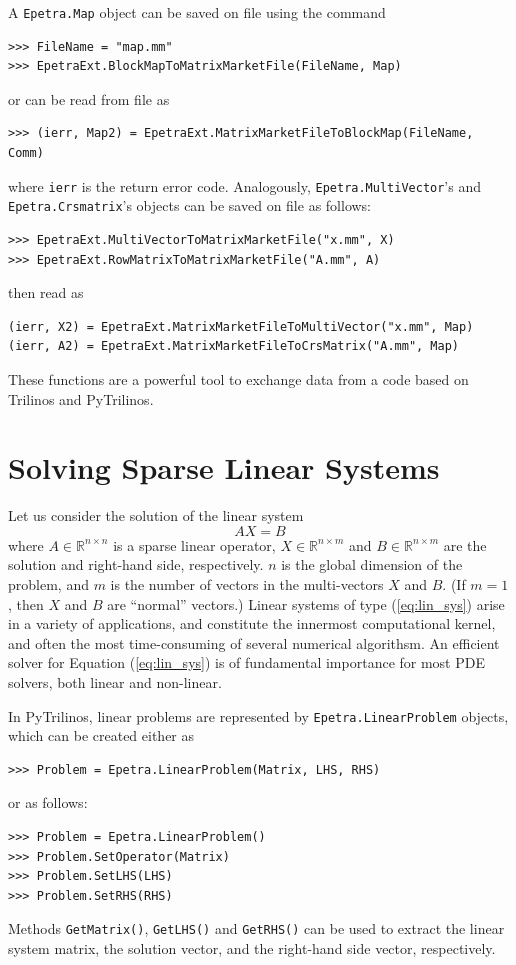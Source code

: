 \documentclass[10pt,relax]{SANDreport}
\newcommand{\PyTrilinos}{{PyTrilinos}}
\begin{document}
A {\tt Epetra.Map} object can be saved on file using the command
\begin{verbatim}
>>> FileName = "map.mm"
>>> EpetraExt.BlockMapToMatrixMarketFile(FileName, Map)
\end{verbatim}
or can be read from file as
\begin{verbatim}
>>> (ierr, Map2) = EpetraExt.MatrixMarketFileToBlockMap(FileName, Comm)
\end{verbatim}
where \verb!ierr! is the return error code. Analogously, 
\verb!Epetra.MultiVector!'s and \verb!Epetra.Crsmatrix!'s objects
can be saved on file as follows:
\begin{verbatim}
>>> EpetraExt.MultiVectorToMatrixMarketFile("x.mm", X)
>>> EpetraExt.RowMatrixToMatrixMarketFile("A.mm", A)
\end{verbatim}
then read as
\begin{verbatim}
(ierr, X2) = EpetraExt.MatrixMarketFileToMultiVector("x.mm", Map)
(ierr, A2) = EpetraExt.MatrixMarketFileToCrsMatrix("A.mm", Map)
\end{verbatim}
These functions are a powerful tool to exchange data from a code based on
Trilinos and PyTrilinos.

\section{Solving Sparse Linear Systems}
\label{sec:linear}

Let us consider the solution of the linear system
\begin{equation}
\label{eq:lin_sys}
A X = B
\end{equation}
where $A \in \mathbb{R}^{n \times n}$ is a sparse linear operator, $X \in
\mathbb{R}^{n \times m}$ and $B \in \mathbb{R}^{n \times m}$ are the solution
and right-hand side, respectively. $n$ is the global dimension of the problem,
  and $m$ is the number of vectors in the multi-vectors $X$ and $B$. 
  (If $m = 1$, then $X$ and $B$ are ``normal'' vectors.)
Linear systems of type (\ref{eq:lin_sys}) arise in a variety of applications,
  and constitute the innermost computational kernel, and often the most
  time-consuming of several numerical algorithsm. An efficient solver for
  Equation (\ref{eq:lin_sys}) is of fundamental importance for most PDE
  solvers, both linear and non-linear.

In \PyTrilinos, linear problems are represented by {\tt Epetra.LinearProblem}
objects, which can be created either as
\begin{verbatim}
>>> Problem = Epetra.LinearProblem(Matrix, LHS, RHS)
\end{verbatim}
or as follows:
\begin{verbatim}
>>> Problem = Epetra.LinearProblem()
>>> Problem.SetOperator(Matrix)
>>> Problem.SetLHS(LHS)
>>> Problem.SetRHS(RHS)
\end{verbatim}
Methods \verb!GetMatrix()!, \verb!GetLHS()! and \verb!GetRHS()! can be used to
extract the linear system matrix, the solution vector, and the right-hand side
vector, respectively.
\end{document}
